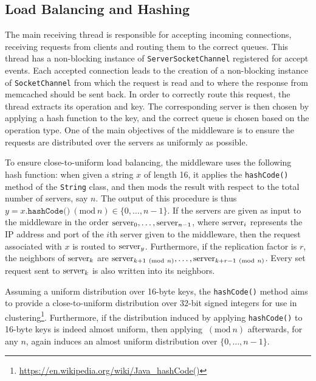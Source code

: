 \documentclass[11pt]{article}
\newcommand{\Mod}[1]{\ (\text{mod}\ #1)}
\begin{document}
\subsection{Load Balancing and Hashing}\label{sec:desc:hashing}

The main receiving thread is responsible for accepting incoming connections, receiving requests from clients and routing them to the correct queues. This thread has a non-blocking instance of \texttt{ServerSocketChannel} registered for accept events. Each accepted connection leads to the creation of a non-blocking instance of \texttt{SocketChannel} from which the request is read and to where the response from memcached should be sent back. In order to correctly route this request, the thread extracts its operation and key. The corresponding server is then chosen by applying a hash function to the key, and the correct queue is chosen based on the operation type. One of the main objectives of the middleware is to ensure the requests are distributed over the servers as uniformly as possible. 

To ensure close-to-uniform load balancing, the middleware uses the following hash function: when given a string $x$ of length 16, it applies the \texttt{hashCode()} method of the \texttt{String} class, and then mods the result with respect to the total number of servers, say $n$. The output of this procedure is thus $y=x.\texttt{hashCode()}\Mod{n}\in\{0,\dots,n-1\}$. If the servers are given as input to the middleware in the order $\textnormal{server}_0,\dots,\textnormal{server}_{n-1}$, where $\textnormal{server}_i$ represents the IP address and port of the $i$th server given to the middleware, then the request associated with $x$ is routed to $\textnormal{server}_y$. Furthermore, if the replication factor is $r$, the neighbors of $\textnormal{server}_k$ are $\textnormal{server}_{k+1 \Mod n},\dots,\textnormal{server}_{k+r-1\Mod n}$. Every set request sent to $\textnormal{server}_k$ is also written into its neighbors.

Assuming a uniform distribution over 16-byte keys, the \texttt{hashCode()} method aims to provide a close-to-uniform distribution over 32-bit signed integers for use in clustering\footnote{\url{https://en.wikipedia.org/wiki/Java_hashCode()}}. Furthermore, if the distribution induced by applying \texttt{hashCode()} to 16-byte keys is indeed almost uniform, then applying $\Mod{n}$ afterwards, for any $n$, again induces an almost uniform distribution over $\{0,\dots,n-1\}$.
\end{document}
